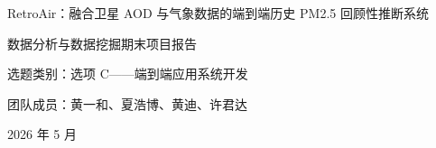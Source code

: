 ﻿\documentclass[UTF8,zihao=-4,a4paper]{ctexart}
\newcommand{\pmfine}{PM$_{2.5}$}
\newcommand{\aod}{AOD}
\begin{document}
\begin{titlepage}
  \centering
  \vspace*{2.6cm}
  {\heiti RetroAir：融合卫星 AOD 与气象数据的端到端历史 PM2.5 回顾性推断系统\par}
  \vspace{1.2cm}
  {\heiti 数据分析与数据挖掘期末项目报告\par}
  \vspace{2.2cm}
  {选题类别：选项 C——端到端应用系统开发\par}
  \vspace{0.8cm}
  {团队成员：黄一和、夏浩博、黄迪、许君达\par}
  \vfill
  {2026 年 5 月\par}
\end{titlepage}

\begin{abstract}
地面空气质量监测站能够提供可靠的 \pmfine{} 浓度观测，但其空间覆盖受建设成本和维护条件限制，难以满足无站点地区历史暴露评估、环境健康研究和城市空气质量回顾分析的需求。针对这一问题，本文设计并实现了 RetroAir，一个融合卫星气溶胶光学厚度（Aerosol Optical Depth, \aod{}）与气象数据的端到端历史 \pmfine{} 回顾性推断系统。系统以 AKShare 真气网监测站数据作为监督标签，结合 CAMS EAC4 气溶胶再分析数据和 NASA POWER 日尺度气象数据，构建覆盖 2018--2025 年、中国 8 个城市、126 个监测站的多源融合数据集。方法上，系统形成了从数据获取、站点对齐、NetCDF 气溶胶特征提取、三源数据合并、特征标准化、模型训练、统一评估到 Web 推理应用的完整流水线。最终特征体系包含 9 个 \aod{} 特征、7 个气象特征和 1 个时间特征。

在模型层面，本文系统比较了 ResMLP、DCN-V2、CatBoost、LightGBM 和 XGBoost 等 5 类回归模型，并使用 10 个随机种子重复实验以降低单次随机切分带来的偶然性。实验结果表明，带 warmup 训练策略的残差多层感知机 ResMLP 在 8 城市 310,756 个样本上取得最优平均表现，测试集 $R^2$ 为 $0.8929\pm0.0031$，RMSE 为 $9.59\pm0.14\ \mu g/m^3$，MAE 为 $6.20\pm0.04\ \mu g/m^3$，Pearson 相关系数为 $0.945\pm0.002$。消融实验显示，气象+\aod{} 特征组合优于引入 OSM 空间特征或 MODIS RGB 反射率的扩展组合，说明本任务中动态气溶胶与气象变量已经提供了主要预测信息。系统最终通过 Streamlit 构建轻量级交互界面，支持地图选点、城市快捷选择、日期选择和一键 \pmfine{} 推理，完成了数据挖掘应用从数据到决策展示的闭环。

\noindent\textbf{关键词：} \pmfine{}；气溶胶光学厚度；多源数据融合；ResMLP；数据挖掘；端到端应用系统
\end{abstract}

\newpage
\tableofcontents
\newpage
\end{document}
